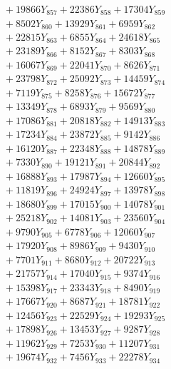\documentclass[a4paper,10pt]{article}
\begin{document}
{\begin{align}
&\;  + 19866 Y_{857} + 22386 Y_{858} + 17304 Y_{859} \\[0.3ex]
&\;  + 8502 Y_{860} + 13929 Y_{861} + 6959 Y_{862} \\[0.3ex]
&\;  + 22815 Y_{863} + 6855 Y_{864} + 24618 Y_{865} \\[0.3ex]
&\;  + 23189 Y_{866} + 8152 Y_{867} + 8303 Y_{868} \\[0.5ex]\allowbreak
&\;  + 16067 Y_{869} + 22041 Y_{870} + 8626 Y_{871} \\[0.3ex]
&\;  + 23798 Y_{872} + 25092 Y_{873} + 14459 Y_{874} \\[0.3ex]
&\;  + 7119 Y_{875} + 8258 Y_{876} + 15672 Y_{877} \\[0.3ex]
&\;  + 13349 Y_{878} + 6893 Y_{879} + 9569 Y_{880} \\[0.3ex]
&\;  + 17086 Y_{881} + 20818 Y_{882} + 14913 Y_{883} \\[0.3ex]
&\;  + 17234 Y_{884} + 23872 Y_{885} + 9142 Y_{886} \\[0.3ex]
&\;  + 16120 Y_{887} + 22348 Y_{888} + 14878 Y_{889} \\[0.3ex]
&\;  + 7330 Y_{890} + 19121 Y_{891} + 20844 Y_{892} \\[0.3ex]
&\;  + 16888 Y_{893} + 17987 Y_{894} + 12660 Y_{895} \\[0.3ex]
&\;  + 11819 Y_{896} + 24924 Y_{897} + 13978 Y_{898} \\[0.5ex]\allowbreak
&\;  + 18680 Y_{899} + 17015 Y_{900} + 14078 Y_{901} \\[0.3ex]
&\;  + 25218 Y_{902} + 14081 Y_{903} + 23560 Y_{904} \\[0.3ex]
&\;  + 9790 Y_{905} + 6778 Y_{906} + 12060 Y_{907} \\[0.3ex]
&\;  + 17920 Y_{908} + 8986 Y_{909} + 9430 Y_{910} \\[0.3ex]
&\;  + 7701 Y_{911} + 8680 Y_{912} + 20722 Y_{913} \\[0.3ex]
&\;  + 21757 Y_{914} + 17040 Y_{915} + 9374 Y_{916} \\[0.3ex]
&\;  + 15398 Y_{917} + 23343 Y_{918} + 8490 Y_{919} \\[0.3ex]
&\;  + 17667 Y_{920} + 8687 Y_{921} + 18781 Y_{922} \\[0.3ex]
&\;  + 12456 Y_{923} + 22529 Y_{924} + 19293 Y_{925} \\[0.3ex]
&\;  + 17898 Y_{926} + 13453 Y_{927} + 9287 Y_{928} \\[0.5ex]\allowbreak
&\;  + 11962 Y_{929} + 7253 Y_{930} + 11207 Y_{931} \\[0.3ex]
&\;  + 19674 Y_{932} + 7456 Y_{933} + 22278 Y_{934} \\[0.3ex]

\end{align}}
\end{document}

